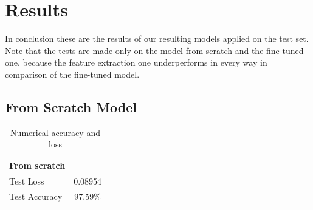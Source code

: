 \chapter{Results}
In conclusion these are the results of our resulting models applied on the test set.
Note that the tests are made only on the model from scratch and the fine-tuned one, because the feature extraction
one underperforms in every way in comparison of the fine-tuned model. 

\section{From Scratch Model}

\begin{table}[H]
	\centering
	\begin{tabular}{|l|c|}
		\hline
		\textbf{From scratch} & \\
		\hline
		Test Loss & 0.08954 \\
		Test Accuracy & 97.59\% \\
		\hline
	\end{tabular}
    \caption{Numerical accuracy and loss}
\end{table}

